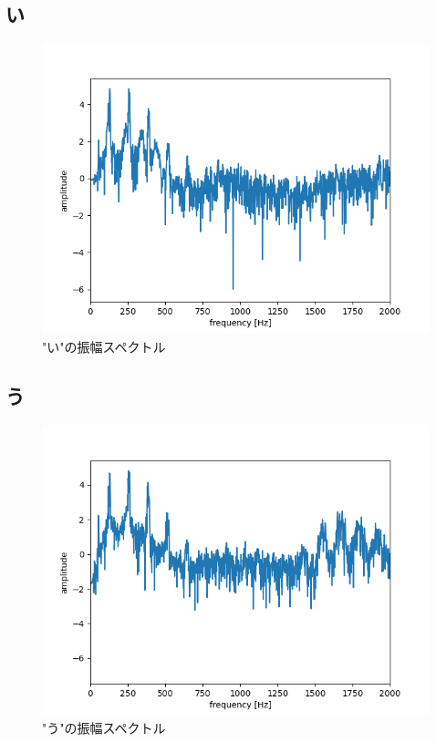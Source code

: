 \documentclass[a4paper,11pt]{jsarticle}
\begin{document}
\subsection*{い}
\begin{figure}[H]
  \centering
  \includegraphics[scale=0.5]{../ex2/img/plot-spectrum-2000_i.png}
  \caption{"い"の振幅スペクトル}
  \label{spectrum_i}
\end{figure}

\subsection*{う}
\begin{figure}[H]
  \centering
  \includegraphics[scale=0.5]{../ex2/img/plot-spectrum-2000_u.png}
  \caption{"う"の振幅スペクトル}
  \label{spectrum_u}
\end{figure}
\end{document}
